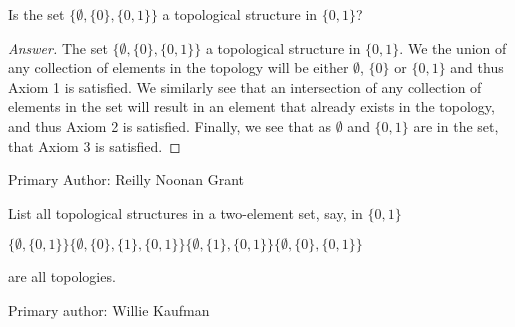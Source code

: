 \begin{minorEx} %
  Is the set $\{ \emptyset, \{ 0 \}, \{0,1\} \}$ a topological
  structure in $\{ 0, 1\}$?
\end{minorEx}

\begin{proof}[Answer]
The set $\{ \emptyset, \{ 0 \}, \{0,1\} \}$ a topological
  structure in $\{ 0, 1\}$. We the union of any collection of elements
  in the topology will be either $\emptyset$, $\{0\}$ or $\{0,1\}$ and 
  thus Axiom 1 is satisfied. We similarly see that an intersection of
  any collection of elements in the set will result in an element that
  already exists in the topology, and thus Axiom 2 is
  satisfied. Finally, we see that as $\emptyset$ and $\{0,1\}$ are in
  the set, that Axiom 3 is satisfied.
\end{proof}

Primary Author: Reilly Noonan Grant

\begin{minorEx} %
  List all topological structures in a two-element set, say, in $\{0 , 1\}$
\end{minorEx}

$\{\emptyset, \{0, 1\}\}
\{\emptyset, \{0\}, \{1\}, \{0, 1\}\}
\{\emptyset, \{1\}, \{0, 1\}\}
\{\emptyset, \{0\}, \{0, 1\}\}$

are all topologies.

Primary author: Willie Kaufman







